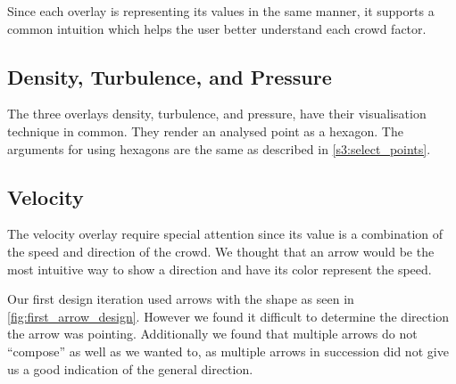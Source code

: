 Since each overlay is representing its values in the same manner, it supports a common intuition which helps the user better understand each crowd factor.

\subsection{Density, Turbulence, and Pressure}
The three overlays density, turbulence, and pressure, have their visualisation technique in common. They render an analysed point as a hexagon. The arguments for using hexagons are the same as described in \cref{s3:select_points}.


\subsection{Velocity}
The velocity overlay require special attention since its value is a combination of the speed and direction of the crowd. We thought that an arrow would be the most intuitive way to show a direction and have its color represent the speed.


Our first design iteration used arrows with the shape as seen in \cref{fig:first_arrow_design}. However we found it difficult to determine the direction the arrow was pointing. Additionally we found that multiple arrows do not \enquote{compose} as well as we wanted to, as multiple arrows in succession did not give us a good indication of the general direction.



